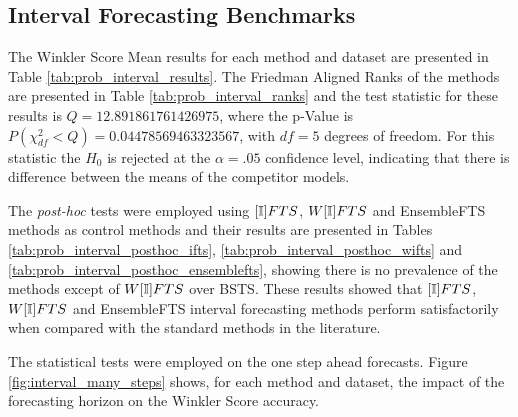 %
\subsection{Interval Forecasting Benchmarks}
\label{sec:prob_experiments_interval}

The Winkler Score Mean results for each method and dataset are presented in Table \ref{tab:prob_interval_results}. The Friedman Aligned Ranks of the methods are presented in Table \ref{tab:prob_interval_ranks} and the test statistic for these results is $Q = 12.891861761426975$, where the p-Value is $P(\chi^2_{df} < Q) = 0.04478569463323567$, with $df=5$ degrees of freedom. For this statistic the $H_0$ is rejected at the $\alpha=.05$ confidence level, indicating that there is difference between the means of the competitor models.

The \textit{post-hoc} tests were employed using $[\mathbb{I}]FTS$, $W[\mathbb{I}]FTS$ and EnsembleFTS methods as control methods and their results are presented in Tables \ref{tab:prob_interval_posthoc_ifts}, \ref{tab:prob_interval_posthoc_wifts} and \ref{tab:prob_interval_posthoc_ensemblefts}, showing there is no prevalence of the methods except of $W[\mathbb{I}]FTS$ over BSTS. These results showed that $[\mathbb{I}]FTS$, $W[\mathbb{I}]FTS$ and EnsembleFTS interval forecasting methods perform satisfactorily when compared with the standard methods in the literature. 

The statistical tests were employed on the one step ahead forecasts. Figure \ref{fig:interval_many_steps} shows, for each method and dataset, the impact of the forecasting horizon on the Winkler Score accuracy.

